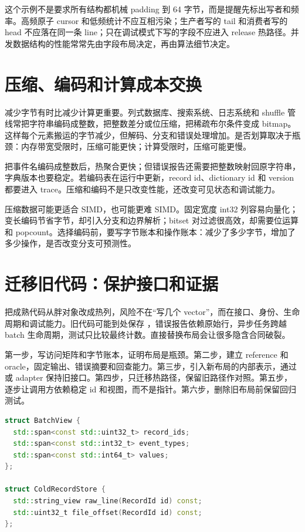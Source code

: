 这个示例不是要求所有结构都机械 padding 到 64 字节，而是提醒先标出写者和频率。高频原子 cursor 和低频统计不应互相污染；生产者写的 tail 和消费者写的 head 不应落在同一条 line；只在调试模式下写的字段不应进入 release 热路径。并发数据结构的性能常常先由字段布局决定，再由算法细节决定。

\section{压缩、编码和计算成本交换}

减少字节有时比减少计算更重要。列式数据库、搜索系统、日志系统和 shuffle 管线常把字符串编码成整数，把整数差分或位压缩，把稀疏布尔条件变成 bitmap。这样每个元素搬运的字节减少，但解码、分支和错误处理增加。是否划算取决于瓶颈：内存带宽受限时，压缩可能更快；计算受限时，压缩可能更慢。

把事件名编码成整数后，热聚合更快；但错误报告还需要把整数映射回原字符串，字典版本也要稳定。若编码表在运行中更新，record id、dictionary id 和 version 都要进入 trace。压缩和编码不是只改变性能，还改变可见状态和调试能力。

压缩数据可能更适合 SIMD，也可能更难 SIMD。固定宽度 int32 列容易向量化；变长编码节省字节，却引入分支和边界解析；bitset 对过滤很高效，却需要位运算和 popcount。选择编码前，要写字节账本和操作账本：减少了多少字节，增加了多少操作，是否改变分支可预测性。

\section{迁移旧代码：保护接口和证据}

把成熟代码从胖对象改成热列，风险不在“写几个 vector”，而在接口、身份、生命周期和调试能力。旧代码可能到处保存 ，错误报告依赖原始行，异步任务跨越 batch 生命周期，测试只比较最终计数。直接替换布局会让很多隐含合同破裂。

第一步，写访问矩阵和字节账本，证明布局是瓶颈。第二步，建立 reference 和 oracle，固定输出、错误摘要和回查能力。第三步，引入新布局的内部表示，通过  或 adapter 保持旧接口。第四步，只迁移热路径，保留旧路径作对照。第五步，逐步让调用方依赖稳定 id 和视图，而不是指针。第六步，删除旧布局前保留回归测试。

\begin{lstlisting}[language=C++,caption={BatchView 把接口和布局分开}]
struct BatchView {
  std::span<const std::uint32_t> record_ids;
  std::span<const std::int32_t> event_types;
  std::span<const std::int64_t> values;
};

struct ColdRecordStore {
  std::string_view raw_line(RecordId id) const;
  std::uint32_t file_offset(RecordId id) const;
};
\end{lstlisting}

